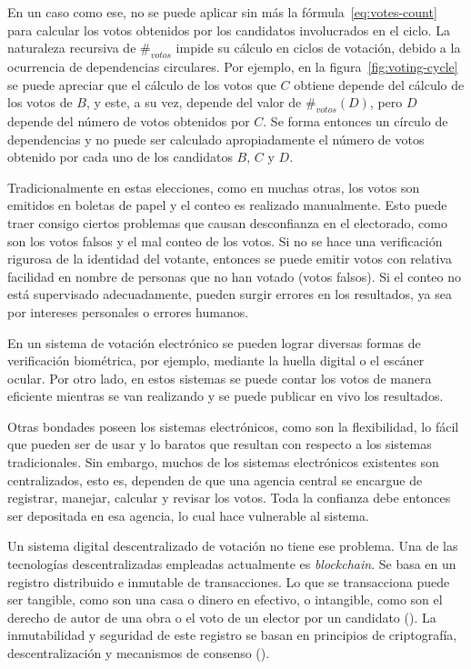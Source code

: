 En un  caso como ese, no se puede aplicar sin m\'as la f\'ormula~\eqref{eq:votes-count} para calcular los votos obtenidos por los candidatos involucrados en el ciclo.  La naturaleza recursiva de $\#_{votos}$ impide su c\'alculo en ciclos de votaci\'on, debido a la ocurrencia de dependencias circulares. Por ejemplo, en la figura~\ref{fig:voting-cycle} se puede apreciar que el c\'alculo de los votos que $C$ obtiene depende del c\'alculo de los votos de $B$, y este, a su vez, depende del valor de $\#_{votos}(D)$, pero $D$ depende del n\'umero de votos obtenidos por $C$. Se forma entonces un c\'irculo de dependencias y no puede ser calculado apropiadamente el n\'umero de votos obtenido por cada uno de los candidatos $B$, $C$ y $D$.




Tradicionalmente en estas elecciones, como en muchas otras, los votos son emitidos en boletas de papel y el conteo es realizado manualmente. Esto puede traer consigo ciertos problemas que causan desconfianza en el electorado, como son los votos falsos y el mal conteo de los votos.   Si no se hace una verificaci\'on rigurosa de la identidad del votante, entonces se puede emitir votos con relativa facilidad en nombre de personas que no han votado (votos falsos). Si el conteo no est\'a supervisado adecuadamente, pueden surgir errores en los resultados, ya sea por intereses personales o errores humanos.

En un sistema de votaci\'on electr\'onico se  pueden lograr diversas formas de verificaci\'on biom\'etrica, por ejemplo, mediante la huella digital o el esc\'aner ocular.  Por otro lado, en estos sistemas se puede contar los votos de manera eficiente mientras se van realizando y se  puede publicar en vivo los resultados. 

Otras bondades poseen los sistemas electrónicos, como son la flexibilidad, lo fácil que pueden ser de usar y lo baratos que resultan con respecto a los sistemas tradicionales. Sin embargo, muchos de los sistemas electrónicos existentes son centralizados, esto es, dependen de que una agencia central se encargue de registrar, manejar, calcular y revisar los votos. Toda la confianza debe entonces ser depositada en esa agencia, lo cual hace vulnerable al sistema. 
 
Un sistema digital descentralizado de votación no tiene ese problema.  Una de las tecnologías descentralizadas empleadas actualmente es \textit{blockchain}.   Se basa en un registro distribuido e inmutable  de transacciones. Lo que se transacciona puede ser tangible, como son  una casa o dinero en efectivo,  o intangible, como son el derecho de autor de una obra o el voto de un elector por un candidato (\cite{blockchain-ibm}). La inmutabilidad y seguridad de este registro se basan en principios de  criptografía, descentralizaci\'on y mecanismos de consenso (\cite{blockch-security-ibm}). 


